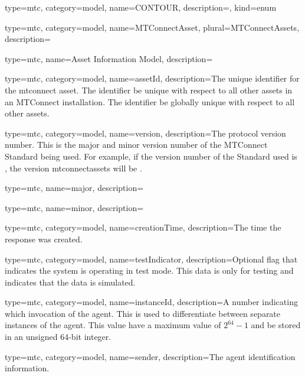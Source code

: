 {
  type=mtc,
  category=model,
  name={CONTOUR},
  description={},
  kind={enum}
}


{
  type=mtc,
  category=model,
  name={MTConnectAsset},
  plural={MTConnectAssets},
  description={}
}


{
  type=mtc,
  name={Asset Information Model},
  description={}
}


{
  type=mtc,
  category=model,
  name={assetId},
  description={The unique identifier for the \gls{mtconnect asset}. The identifier \MUST be unique with respect to all other \glspl{asset} in an MTConnect installation. The identifier \SHOULD be globally unique with respect to all other \glspl{asset}.}
}


{
  type=mtc,
  category=model,
  name={version},
  description={The protocol version number. This is the \gls{major} and \gls{minor} version number of the MTConnect Standard being used. For example, if the version number of the Standard used is , the \gls{version mtconnectassets} will be .}
}


{
  type=mtc,
  name={major},
  description={}
}


{
  type=mtc,
  name={minor},
  description={}
}


{
  type=mtc,
  category=model,
  name={creationTime},
  description={The time the response was created. }
}


{
  type=mtc,
  category=model,
  name={testIndicator},
  description={Optional flag that indicates the system is operating in test mode. This data is only for testing and indicates that the data is simulated. }
}


{
  type=mtc,
  category=model,
  name={instanceId},
  description={A number indicating which invocation of the \gls{agent}. This is used to differentiate between separate instances of the \gls{agent}. This value \MUST have a maximum value of $2^{64}-1$ and \MUST be stored in an unsigned 64-bit integer. }
}


{
  type=mtc,
  category=model,
  name={sender},
  description={The \gls{agent} identification information. }
}


